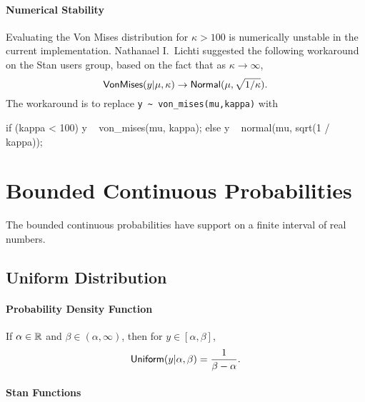 \begin{description}
\end{description}
\subsubsection{Numerical Stability}

Evaluating the Von Mises distribution for $\kappa > 100$ is
numerically unstable in the current implementation.  Nathanael I.\
Lichti suggested the following workaround on the Stan users group,
based on the fact that as $\kappa \rightarrow \infty$,
\[
\mbox{\sf VonMises}(y|\mu,\kappa) \rightarrow \mbox{\sf Normal}(\mu,
\sqrt{1 / \kappa}).
\]
%
The workaround is to replace \Verb|y ~ von_mises(mu,kappa)| with
%
\begin{stancode}
if (kappa < 100)
  y ~ von_mises(mu, kappa);
else
  y ~ normal(mu, sqrt(1 / kappa));
\end{stancode}


\chapter{Bounded Continuous Probabilities}

\noindent
The bounded continuous probabilities have support on a finite interval
of real numbers.



\section{Uniform Distribution}

\subsubsection{Probability Density Function}

If $\alpha \in \mathbb{R}$ and $\beta \in (\alpha,\infty)$, then for $y
\in [\alpha,\beta]$,
\[
\mbox{\sf Uniform}(y|\alpha,\beta)
=
\frac{1}{\beta - \alpha}
.
\]


\subsubsection{Stan Functions}

